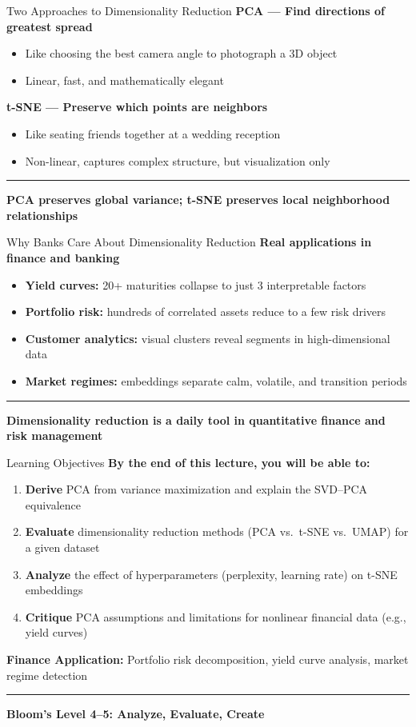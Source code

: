 \documentclass[8pt,aspectratio=169]{beamer}
\newcommand{\bottomnote}[1]{%
\vfill
\vspace{-2mm}
\textcolor{mllavender2}{\rule{\textwidth}{0.4pt}}
\vspace{1mm}
\footnotesize
\textbf{#1}
}
\newcommand{\highlight}[1]{\textcolor{mlorange}{\textbf{#1}}}
\begin{document}
\begin{frame}[t]{Two Approaches to Dimensionality Reduction}
\textbf{PCA --- Find directions of greatest spread}
\begin{itemize}
  \item Like choosing the best camera angle to photograph a 3D object
  \item Linear, fast, and mathematically elegant
\end{itemize}
\vspace{0.8em}
\textbf{t-SNE --- Preserve which points are neighbors}
\begin{itemize}
  \item Like seating friends together at a wedding reception
  \item Non-linear, captures complex structure, but visualization only
\end{itemize}
\bottomnote{PCA preserves global variance; t-SNE preserves local neighborhood relationships}
\end{frame}

\begin{frame}[t]{Why Banks Care About Dimensionality Reduction}
\textbf{Real applications in finance and banking}
\begin{itemize}
  \item \highlight{Yield curves:} 20+ maturities collapse to just 3 interpretable factors
  \item \highlight{Portfolio risk:} hundreds of correlated assets reduce to a few risk drivers
  \item \highlight{Customer analytics:} visual clusters reveal segments in high-dimensional data
  \item \highlight{Market regimes:} embeddings separate calm, volatile, and transition periods
\end{itemize}
\bottomnote{Dimensionality reduction is a daily tool in quantitative finance and risk management}
\end{frame}

\begin{frame}[t]{Learning Objectives}
\textbf{By the end of this lecture, you will be able to:}
\begin{enumerate}
  \item \textbf{Derive} PCA from variance maximization and explain the SVD--PCA equivalence
  \item \textbf{Evaluate} dimensionality reduction methods (PCA vs.\ t-SNE vs.\ UMAP) for a given dataset
  \item \textbf{Analyze} the effect of hyperparameters (perplexity, learning rate) on t-SNE embeddings
  \item \textbf{Critique} PCA assumptions and limitations for nonlinear financial data (e.g., yield curves)
\end{enumerate}
\vspace{0.5em}
\textbf{Finance Application:} Portfolio risk decomposition, yield curve analysis, market regime detection
\bottomnote{Bloom's Level 4--5: Analyze, Evaluate, Create}
\end{frame}
\end{document}
